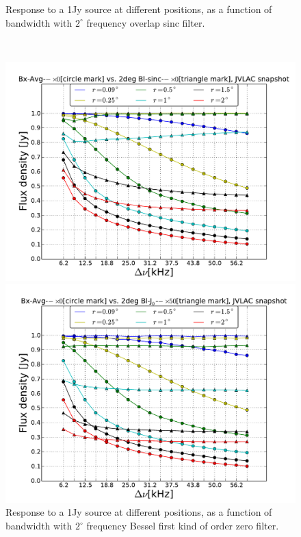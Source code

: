 \documentclass[useAMS,usenatbib]{mn2e}
\begin{document}
\begin{figure}
\begin{minipage}{0.36\linewidth}
        \caption{Response to a 1Jy source at different positions, as a function of bandwidth with $2^{\circ}$ frequency overlap sinc 
filter.}
        \label{fig:max-integ-freq-sinc-w1x50-fov2}
        \end{minipage}\\
  \begin{minipage}{0.36\linewidth}\includegraphics[width=1\textwidth]{./Figures/max-integ-freq-bessel-w1x1-fov2.pdf}
        \caption{Response to a 1Jy source at different positions, as a function of bandwidth with $2^{\circ}$ frequency Bessel first kind 
of 
  order zero filter.}
        \label{fig:max-integ-freq-bessel-w1x1-fov2}
        \end{minipage}
  \hspace{1cm}
  \begin{minipage}{0.36\linewidth}\includegraphics[width=1\textwidth]{./Figures/max-integ-freq-bessel-w1x50-fov2.pdf}

\end{minipage}
\end{figure}
\end{document}
